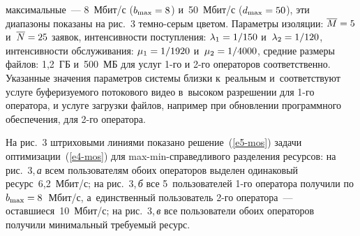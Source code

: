 \begin{multicols}{2}
\noindent
 максимальные~--- 
8~Мбит/с ($b_{\max}\hm=8$) и~50~Мбит/с ($d_{\max}\hm=50$), эти 
диапазоны показаны на рис.~3 тем\-но-се\-рым цветом. Параметры 
изоляции: $\overline{M}\hm=5$ и~$\overline{N}\hm=25$ заявок, 
интенсивности поступления: $\lambda_1\hm=1/150$ и~$\lambda_2\hm=1/120$, 
интенсивности обслуживания: $\mu_1\hm= 1/1920$ и~$\mu_2\hm=1/4000$, 
средние размеры файлов: 1,2~ГБ и~500~МБ для услуг 1-го и 2-го операторов 
соответственно. Указанные значения параметров сис\-те\-мы близ\-ки 
к~реальным и~соответствуют услуге буферизуемого потокового видео 
в~высоком разрешении для 1-го оператора, и услуге загрузки файлов, 
например
при обновлении программного обеспечения, для 2-го оператора.
  
  На рис.~3 штриховыми линиями показано решение~(\ref{e5-mos}) задачи 
оптимизации~(\ref{e4-mos}) для  
max-min-спра\-вед\-ли\-во\-го разделения ресурсов: на рис.~3,\,\textit{а} всем 
пользователям обоих операторов выделен одинаковый ресурс~6,2~Мбит/с; 
на рис.~3,\,\textit{б} все 5~пользователей 1-го оператора получили по 
$b_{\max}\hm=8$~Мбит/с, а~единственный пользователь 2-го оператора~--- 
оставшиеся~10~Мбит/с; на рис.~3,\,\textit{в} все пользователи обоих 
операторов получили минимальный требуемый ресурс.


\begin{figure*} %
\vspace*{1pt}
    \begin{center}  
  \mbox{%
 \epsfxsize=160.393mm 
 }
\end{center}
\vspace*{-11pt}
\end{figure*}
  

\end{multicols}

